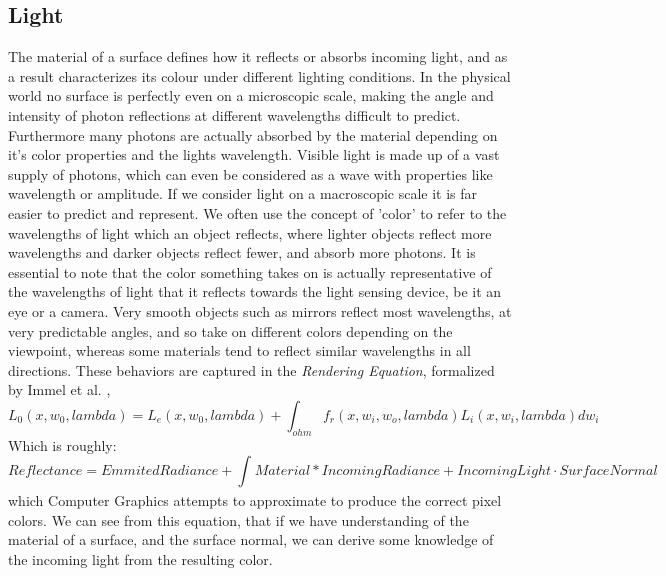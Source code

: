 \documentclass[ %
                    author={Gavin Parker},
                supervisor={Dr. Neill Campbell},
                    degree={MEng},
                     title={Deep Siamese Networks for Illumination Estimation from Stereo Images},
                  subtitle={},
                      type={Research},
                      year={2018} ]{dissertation}
\begin{document}
\subsection{Light}
The material of a surface defines how it reflects or absorbs incoming light, and as a result characterizes its colour under different lighting conditions. In the physical world no surface is perfectly even on a microscopic scale, making the angle and intensity of photon reflections at different wavelengths difficult to predict. Furthermore many photons are actually absorbed by the material depending on it's color properties and the lights wavelength. Visible light is made up of a vast supply of photons, which can even be considered as a wave with properties like wavelength or amplitude. If we consider light on a macroscopic scale it is far easier to predict and represent. We often use the concept of 'color' to refer to the wavelengths of light which an object reflects, where lighter objects reflect more wavelengths and darker objects reflect fewer, and absorb more photons. It is essential to note that the color something takes on is actually representative of the wavelengths of light that it reflects towards the light sensing device, be it an eye or a camera. Very smooth objects such	 as mirrors reflect most wavelengths, at very predictable angles, and so take on different colors depending on the viewpoint, whereas some materials tend to reflect similar wavelengths in all directions. These behaviors are captured in the \textit{Rendering Equation}, formalized by Immel et al. \cite{Immel:1986:RMN:15886.15901},
\[L_0(x, w_0, lambda) = L_e(x, w_0, lambda) + \int_{ohm}{f_r(x, w_i, w_o,lambda)L_i(x, w_i, lambda)dw_i}\]
Which is roughly:
\[Reflectance = Emmited Radiance +  \int_{}{Material * Incoming Radiance + Incoming Light \cdot Surface Normal}\]
which Computer Graphics attempts to approximate to produce the correct pixel colors. We can see from this equation, that if we have understanding of the material of a surface, and the surface normal, we can derive some knowledge of the incoming light from the resulting color.
\end{document}
